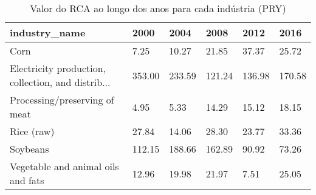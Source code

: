 \begin{table}
\centering
\caption{Valor do RCA ao longo dos anos para cada indústria (PRY)}
\begin{tabular}{p{6cm}p{1.5cm}p{1.5cm}p{1.5cm}p{1.5cm}p{1.5cm}}
\toprule
                                     industry\_name &   2000 &   2004 &   2008 &   2012 &   2016 \\
\midrule
                                              Corn &   7.25 &  10.27 &  21.85 &  37.37 &  25.72 \\
Electricity production, collection, and distrib... & 353.00 & 233.59 & 121.24 & 136.98 & 170.58 \\
                     Processing/preserving of meat &   4.95 &   5.33 &  14.29 &  15.12 &  18.15 \\
                                        Rice (raw) &  27.84 &  14.06 &  28.30 &  23.77 &  33.36 \\
                                          Soybeans & 112.15 & 188.66 & 162.89 &  90.92 &  73.26 \\
                Vegetable and animal oils and fats &  12.96 &  19.98 &  21.97 &   7.51 &  25.05 \\
\bottomrule
\end{tabular}
\end{table}
